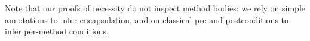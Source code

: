 %  



  






 

\noindent
Note that our proofs of necessity do not inspect method
bodies: we rely on simple annotations to infer encapsulation, and on
classical pre and postconditions to infer per-method conditions. 

